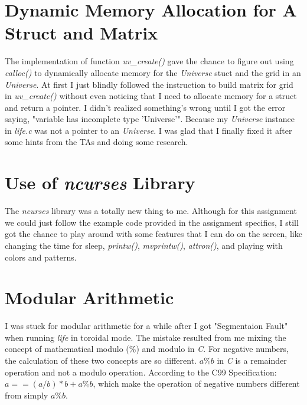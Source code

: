 \documentclass[12pt]{article}
\begin{document}
\section{Dynamic Memory Allocation for A Struct and Matrix}

The implementation of function \textit{uv\_create()} gave the chance to figure out using \textit{calloc()} to dynamically allocate memory for the \textit{Universe} stuct and the grid in an \textit{Universe}. At first I just blindly followed the instruction to build matrix for grid in \textit{uv\_create()} without even noticing that I need to allocate memory for a struct and return a pointer. I didn't realized something's wrong until I got the error saying, "variable has incomplete type 'Universe'". Because my \textit{Universe} instance in \textit{life.c} was not a pointer to an \textit{Universe}. I was glad that I finally fixed it after some hints from the TAs and doing some research.

\section{Use of \textit{ncurses} Library}

The \textit{ncurses} library was a totally new thing to me. Although for this assignment we could just follow the example code provided in the assignment specifics, I still got the chance to play around with some features that I can do on the screen, like changing the time for sleep, \textit{printw()}, \textit{mvprintw()}, \textit{attron()}, and playing with colors and patterns. 

\section{Modular Arithmetic}

I was stuck for modular arithmetic for a while after I got "Segmentaion Fault" when running \textit{life} in toroidal mode. The mistake resulted from me mixing the concept of mathematical modulo (\%) and modulo in \textit{C}. For negative numbers, the calculation of these two concepts are so different. $a \% b$ in \textit{C} is a remainder operation and not a modulo operation. According to the C99 Specification: $a == (a / b) * b + a \% b$, which make the operation of negative numbers different from simply $a \% b$.
\end{document}

